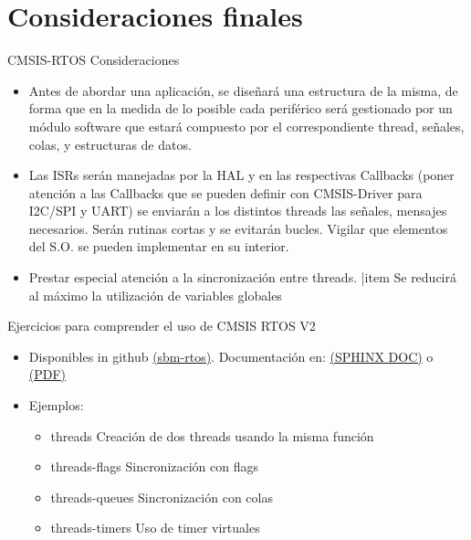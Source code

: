 \section{Consideraciones finales}
\begin{frame}{CMSIS-RTOS Consideraciones}
\begin{itemize}
    \item Antes de abordar una aplicación, se diseñará una estructura de la misma, de forma que en la medida de lo posible cada periférico será gestionado por un módulo software que estará compuesto por el correspondiente thread, señales, colas, y estructuras de datos. 
    \item Las ISRs serán manejadas por la HAL y en las respectivas Callbacks (poner atención a las Callbacks que se pueden definir con CMSIS-Driver para I2C/SPI y UART) se enviarán a los distintos threads las señales, mensajes necesarios. Serán rutinas cortas y se evitarán bucles. Vigilar que elementos del S.O. se pueden implementar en su interior.
    \item Prestar especial atención a la sincronización entre threads.
    |item Se reducirá al máximo la utilización de variables globales
\end{itemize}

\end{frame}
\begin{frame}{Ejercicios para comprender el uso de CMSIS RTOS V2}
    \begin{itemize}
        \item Disponibles in github \href{https://github.com/mruizlgz/SBM-rtos}{(sbm-rtos)}. Documentación en: \href{https://mruizglz.github.io/SBM-rtos}{(SPHINX DOC)} o \href{https://mruizglz.github.io/SBM-rtos/simplepdf/SBM-CMSIS-RTOS-V2.pdf}{(PDF)}
        
        \item Ejemplos:
            \begin{itemize}
                \item threads Creación de dos threads usando la misma función
                \item threads-flags Sincronización con flags
                \item threads-queues Sincronización con colas
                \item threads-timers Uso de timer virtuales
            \end{itemize}
    \end{itemize}
\end{frame}
